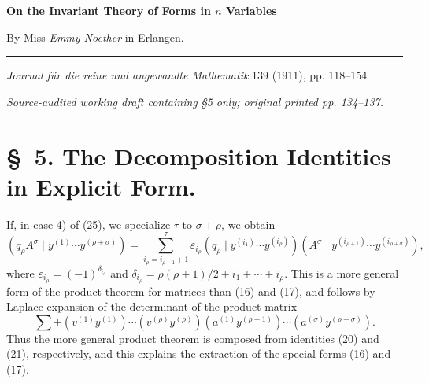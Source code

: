 \documentclass[10pt]{article}
\newcommand{\pair}[2]{(#1\mid #2)}
\newcommand{\eps}{\varepsilon}
\begin{document}
\begin{center}
{\Large\bfseries On the Invariant Theory of Forms in $n$ Variables}\par
\vspace{0.5em}
By Miss \emph{Emmy Noether} in Erlangen.\par
\medskip
\rule{0.22\linewidth}{0.4pt}\par
\vspace{0.7em}
\emph{Journal f\"ur die reine und angewandte Mathematik} 139 (1911), pp. 118--154\par
\smallskip
{\small\itshape Source-audited working draft containing \S5 only; original printed pp. 134--137.}
\end{center}

\section*{\S\ 5. The Decomposition Identities in Explicit Form.}

If, in case 4) of (25), we specialize $\tau$ to $\sigma+\rho$, we obtain
\begin{equation}
 \pair{q_\rho A^\sigma}{y^{(1)}\cdots y^{(\rho+\sigma)}}
 =\sum_{i_\rho=i_{\rho-1}+1}^{\tau}
 \eps_{i_\rho}\pair{q_\rho}{y^{(i_1)}\cdots y^{(i_\rho)}}
 \pair{A^\sigma}{y^{(i_{\rho+1})}\cdots y^{(i_{\rho+\sigma})}},
\tag{32}
\end{equation}
where $\eps_{i_\rho}=(-1)^{\delta_{i_\rho}}$ and
$\delta_{i_\rho}=\rho(\rho+1)/2+i_1+\cdots+i_\rho$. This is a more general
form of the product theorem for matrices than (16) and (17), and follows by
Laplace expansion of the determinant of the product matrix
\[
 \sum\pm(v^{(1)}y^{(1)})\cdots(v^{(\rho)}y^{(\rho)})
 (a^{(1)}y^{(\rho+1)})\cdots(a^{(\sigma)}y^{(\rho+\sigma)}).
\]
Thus the more general product theorem is composed from identities (20) and
(21), respectively, and this explains the extraction of the special forms
(16) and (17).
\end{document}
